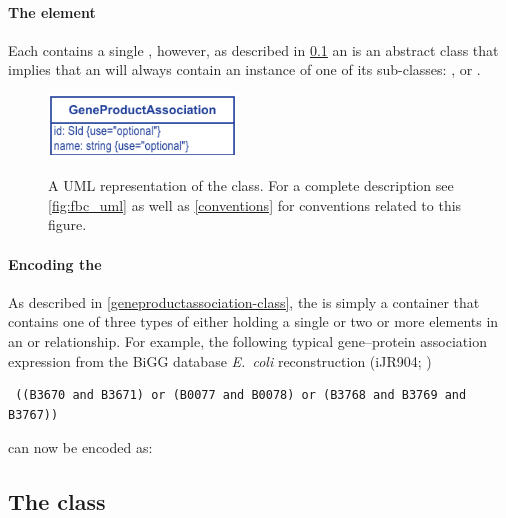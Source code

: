 \paragraph{The  element}
Each \GeneProductAssociation contains a single \Association, however, as
described in \ref{association-class} an \Association is an abstract class
that implies that an  will always contain an instance
of one of its sub-classes: \GeneAnd, \GeneOr or \GeneProductRef.
%
\begin{figure}[h!]
  \centering
  \includegraphics[width=5cm]{images/v2harmony_fbc_geneproductassociation.pdf}\\
  \caption{A UML representation of the \FBCPackage \GeneProductAssociation class.
	For a complete description see \ref{fig:fbc_uml} as well as \ref{conventions} for conventions related to this figure.}
  \label{fig:fbc_uml_ga}
\end{figure}

\paragraph{Encoding the \GeneProductAssociation}
As described in \ref{geneproductassociation-class}, the \GeneProductAssociation
is simply a container that contains one of three types of \Association either
holding a single \GeneProductRef or two or more \Association elements in an
\GeneAnd or \GeneOr relationship. For example, the following typical
gene--protein association expression from the BiGG database \emph{E.~coli}
reconstruction (iJR904; \citealt{ijr904, bigg})
%
\begin{verbatim}
 ((B3670 and B3671) or (B0077 and B0078) or (B3768 and B3769 and B3767))
\end{verbatim}
%
can now be encoded as:
%
\pagebreak
\subsection{The \FBC {} class}
\label{association-class}

